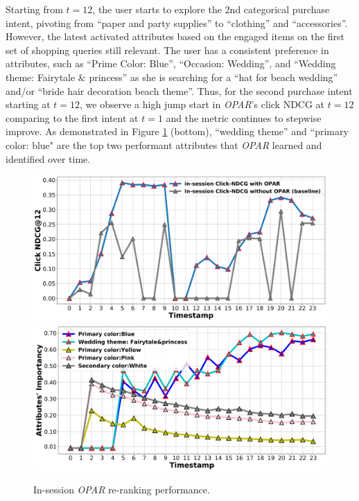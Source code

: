 \documentclass[11pt, dvipdfmx]{article}
\begin{document}
Starting from $t=12$, the user starts to explore the 2nd categorical purchase intent, pivoting from ``paper and party supplies'' to ``clothing'' and ``accessories''. However, the latest activated attributes based on the engaged items on the first set of shopping queries still relevant. The user has a consistent preference in attributes, such as ``Prime Color: Blue'', ``Occasion: Wedding'', and ``Wedding theme: Fairytale $\&$ princess'' as she is searching for a ``hat for beach wedding'' and/or ``bride hair decoration beach theme''. Thus, for the second purchase intent starting at $t=12$, we observe a high jump start in \textit{OPAR}'s click NDCG at $t=12$ comparing to the first intent at $t=1$ and the metric continues to stepwise improve. As demonstrated in Figure \ref{fig:multiIntent} (bottom), ``wedding theme'' and ``primary color: blue" are the top two performant attributes that \emph{OPAR} learned and identified over time. 

\begin{figure}[!t]
    \centering
    \includegraphics[bb=-200 0 0 60]{figs/Figure4_inSessionNDCG_png}
    \includegraphics[bb=0 0 200 60]{figs/Figure5_interpretableAttribute_png}
    \caption{In-session \textit{OPAR} re-ranking performance.}
    \label{fig:multiIntent}
\end{figure}
\end{document}
